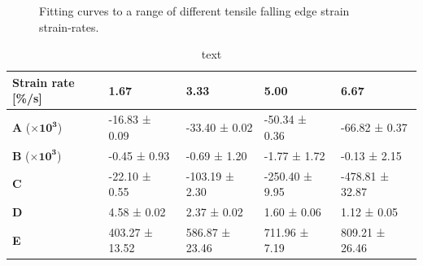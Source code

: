 \begin{figure}[H]
\begin{minipage}[t]{.49\textwidth}
	\end{minipage}
	\caption{Fitting curves to a range of different tensile falling edge strain strain-rates.}
	\label{fig:}
\end{figure}
\begin{table}[H]
	\centering
	\caption{text}
	\label{tab:}
	\begin{tabular}{lllll}
		\hline
		\textbf{Strain rate [\%/s]} & \textbf{1.67} & \textbf{3.33} & \textbf{5.00} & \textbf{6.67} \\ \hline
		\textbf{A} ($\mathbf{\times 10^3}$) & -16.83 ± 0.09 & -33.40 ± 0.02 & -50.34 ± 0.36 & -66.82 ± 0.37 \\ \hline
		\textbf{B} ($\mathbf{\times 10^3}$) & -0.45 ± 0.93 & -0.69 ± 1.20 & -1.77 ± 1.72 & -0.13 ± 2.15 \\ \hline
		\textbf{C} & -22.10 ± 0.55 & -103.19 ± 2.30 & -250.40 ± 9.95 & -478.81 ± 32.87 \\ \hline
		\textbf{D} & 4.58 ± 0.02 & 2.37 ± 0.02 & 1.60 ± 0.06 & 1.12 ± 0.05 \\ \hline
		\textbf{E} & 403.27 ± 13.52 & 586.87 ± 23.46 & 711.96 ± 7.19 & 809.21 ± 26.46 \\ \hline
	\end{tabular}
\end{table}


